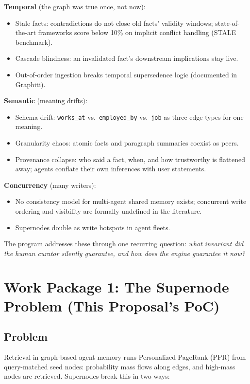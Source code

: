 \documentclass[11pt,a4paper]{article}
\newcommand{\code}[1]{\texttt{#1}}
\begin{document}
\textbf{Temporal} (the graph was true once, not now):
\begin{itemize}[nosep]
  \item Stale facts: contradictions do not close old facts' validity windows; state-of-the-art frameworks score below 10\% on implicit conflict handling (STALE benchmark).
  \item Cascade blindness: an invalidated fact's downstream implications stay live.
  \item Out-of-order ingestion breaks temporal supersedence logic (documented in Graphiti).
\end{itemize}

\textbf{Semantic} (meaning drifts):
\begin{itemize}[nosep]
  \item Schema drift: \code{works\_at} vs.\ \code{employed\_by} vs.\ \code{job} as three edge types for one meaning.
  \item Granularity chaos: atomic facts and paragraph summaries coexist as peers.
  \item Provenance collapse: who said a fact, when, and how trustworthy is flattened away; agents conflate their own inferences with user statements.
\end{itemize}

\textbf{Concurrency} (many writers):
\begin{itemize}[nosep]
  \item No consistency model for multi-agent shared memory exists; concurrent write ordering and visibility are formally undefined in the literature.
  \item Supernodes double as write hotspots in agent fleets.
\end{itemize}

The program addresses these through one recurring question: \emph{what invariant did the human curator silently guarantee, and how does the engine guarantee it now?}

\section{Work Package 1: The Supernode Problem (This Proposal's PoC)}

\subsection{Problem}

Retrieval in graph-based agent memory runs Personalized PageRank (PPR) from query-matched seed nodes: probability mass flows along edges, and high-mass nodes are retrieved. Supernodes break this in two ways:
\end{document}

